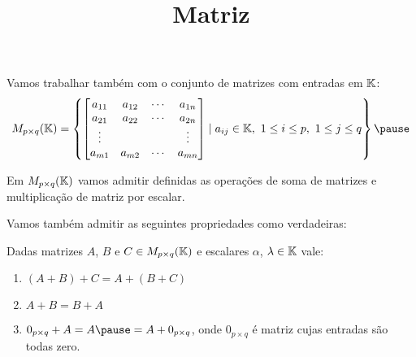 \documentclass{beamer}
\title{Matriz}
\author[\autor]{\autor}
\institute[\instituto]{\instituto}
\date{}
\begin{document}
    \begin{frame}
        \maketitle
    \end{frame}


    \begin{frame}
        Vamos trabalhar também com o conjunto de matrizes com entradas em $\mathbb{K}$:\pause
        \[
            M_{p \times q}(\cp{K}) =
            \left\{
                \begin{bmatrix}
                    a_{11} & a_{12} & \cdots & a_{1n}\\
                    a_{21} & a_{22} & \cdots & a_{2n}\\
                    \vdots & & & \vdots\\
                    a_{m1} & a_{m2} & \cdots & a_{mn}
                \end{bmatrix}
                \mid a_{ij} \in \cp{K},\ 1 \le i \le p,\ 1 \le j \le q
            \right\}\pause
        \]
    \end{frame}

    \begin{frame}
        Em $M_{p\times q}(\mathbb{K})$ vamos admitir definidas as operações de soma de matrizes \pause e multiplicação de matriz por escalar.\pause

        Vamos também admitir as seguintes propriedades como verdadeiras:\pause
        \begin{proposicao}
            Dadas matrizes $A$, $B$ e $C \in M_{p\times q}(\mathbb{K})$ \pause e escalares $\alpha$, $\lambda \in \mathbb{K}$ vale:\pause
            \begin{enumerate}[label={\roman*})]
                \item $(A + B) + C = A + (B + C)$\pause
                \item $A + B = B + A$\pause
                \item $0_{p \times q} + A = A \pause = A + 0_{p \times q}$, \pause onde $0_{p \times q}$ é matriz cujas entradas são todas zero.\pause
                \seti
            \end{enumerate}
        \end{proposicao}
    \end{frame}
\end{document}
